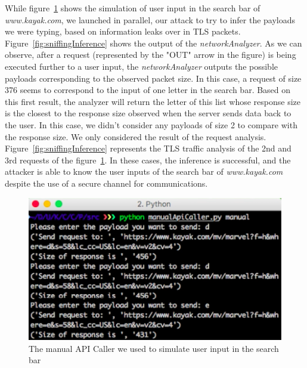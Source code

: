 \documentclass[runningheads]{llncs}
\begin{document}
While figure~\ref{fig:manualApiCaller} shows the simulation of user input in the search bar of \emph{www.kayak.com}, we launched in parallel, our attack to try to infer the payloads we were typing, based on information leaks over in TLS packets. Figure~\ref{fig:sniffingInference} shows the output of the \emph{networkAnalyzer}. As we can observe, after a request (represented by the "OUT" arrow in the figure) is being executed further to a user input, the \emph{networkAnalyzer} outputs the possible payloads corresponding to the observed packet size. In this case, a request of size 376 seems to correspond to the input of one letter in the search bar. Based on this first result, the analyzer will return the letter of this list whose response size is the closest to the response size observed when the server sends data back to the user. In this case, we didn't consider any payloads of size 2 to compare with the response size. We only considered the result of the request analysis. Figure~\ref{fig:sniffingInference} represents the TLS traffic analysis of the 2nd and 3rd requests of the figure~\ref{fig:manualApiCaller}. In these cases, the inference is successful, and the attacker is able to know the user inputs of the search bar of \emph{www.kayak.com} despite the use of a secure channel for communications.

\begin{figure}[h]
\centering
\includegraphics[width=\textwidth]{images/manualApiCallerForSniffingTest.png}
\caption{The manual API Caller we used to simulate user input in the search bar}
\label{fig:manualApiCaller}
\end{figure}

\medskip
\end{document}
